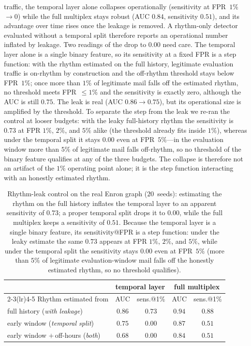 \documentclass[conference]{IEEEtran}
\begin{document}
traffic, the temporal layer alone collapses operationally (sensitivity at FPR~$1\%$ $\to 0$) while the full
multiplex stays robust (AUC $0.84$, sensitivity $0.51$), and its advantage over time rises once the leakage is
removed. A rhythm-only detector evaluated without a temporal split therefore reports an operational number
inflated by leakage. Two readings of the drop to $0.00$ need care. The temporal layer alone is a single binary
feature, so its sensitivity at a fixed FPR is a step function: with the rhythm estimated on the full history,
legitimate evaluation traffic is on-rhythm by construction and the off-rhythm threshold stays below FPR~$1\%$;
once more than $1\%$ of legitimate mail falls off the estimated rhythm, no threshold meets FPR~$\le1\%$ and
the sensitivity is exactly zero, although the AUC is still $0.75$. The leak is real (AUC $0.86\!\to\!0.75$),
but its operational size is amplified by the threshold. To separate the step from the leak we re-ran the
control at looser budgets: with the leaky full-history rhythm the sensitivity is $0.73$ at FPR
$1\%$, $2\%$, and $5\%$ alike (the threshold already fits inside $1\%$), whereas under the temporal split
it stays $0.00$ even at FPR~$5\%$---in the evaluation window more than $5\%$ of legitimate mail falls
off-rhythm, so no threshold of the binary feature qualifies at any of the three budgets. The collapse is
therefore not an artifact of the $1\%$ operating point alone; it is the step function interacting with an
honestly estimated rhythm.

\begin{table}[t]\centering\scriptsize\setlength{\tabcolsep}{3pt}
\caption{Rhythm-leak control on the real Enron graph ($20$~seeds): estimating the rhythm on the full history
inflates the temporal layer to an apparent sensitivity of $0.73$; a proper temporal split drops it to $0.00$,
while the full multiplex keeps a sensitivity of $0.51$. Because the temporal layer is a single binary feature, its
sensitivity@FPR is a step function: under the leaky estimate the same $0.73$ appears at FPR $1\%$, $2\%$,
and $5\%$, while under the temporal split the sensitivity stays $0.00$ even at FPR~$5\%$ (more than $5\%$ of
legitimate evaluation-window mail falls off the honestly estimated rhythm, so no threshold qualifies).}
\label{tab:enronsplit}
\begin{tabular}{lcccc}
\toprule
 & \multicolumn{2}{c}{temporal layer} & \multicolumn{2}{c}{full multiplex} \\
\cmidrule(lr){2-3}\cmidrule(lr){4-5}
Rhythm estimated from & AUC & sens.@1\% & AUC & sens.@1\% \\
\midrule
full history (\emph{with leakage}) & $0.86$ & $0.73$ & $0.94$ & $0.88$ \\
early window (\emph{temporal split}) & $0.75$ & $0.00$ & $0.87$ & $0.51$ \\
early window $+\,$off-hours (\emph{both}) & $0.68$ & $0.00$ & $\mathbf{0.84}$ & $\mathbf{0.51}$ \\
\bottomrule
\end{tabular}
\end{table}
\end{document}
